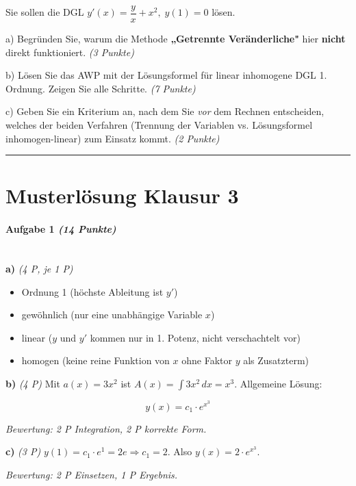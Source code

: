 \documentclass[11pt, a4paper]{article}
\begin{document}
Sie sollen die DGL $y'(x) = \dfrac{y}{x} + x^2, \; y(1) = 0$ lösen.


a) Begründen Sie, warum die Methode \textbf{„Getrennte Veränderliche"} hier \textbf{nicht} direkt funktioniert. \textit{(3 Punkte)}


b) Lösen Sie das AWP mit der Lösungsformel für linear inhomogene DGL 1. Ordnung. Zeigen Sie alle Schritte. \textit{(7 Punkte)}


c) Geben Sie ein Kriterium an, nach dem Sie \textit{vor} dem Rechnen entscheiden, welches der beiden Verfahren (Trennung der Variablen vs. Lösungsformel inhomogen-linear) zum Einsatz kommt. \textit{(2 Punkte)}



\noindent\textcolor{rulegray}{\rule{\linewidth}{0.4pt}}



\section{Musterlösung Klausur 3}

\paragraph{Aufgabe 1 \textit{(14 Punkte)}}\mbox{}\\[2pt]

\textbf{a)} \textit{(4 P, je 1 P)}

\begin{itemize}
  \item Ordnung 1 (höchste Ableitung ist $y'$)
  \item gewöhnlich (nur eine unabhängige Variable $x$)
  \item linear ($y$ und $y'$ kommen nur in 1. Potenz, nicht verschachtelt vor)
  \item homogen (keine reine Funktion von $x$ ohne Faktor $y$ als Zusatzterm)
\end{itemize}

\textbf{b)} \textit{(4 P)} Mit $a(x) = 3x^2$ ist $A(x) = \int 3x^2\,dx = x^3$. Allgemeine Lösung:

\[
y(x) = c_1 \cdot e^{x^3}
\]

\textit{Bewertung: 2 P Integration, 2 P korrekte Form.}


\textbf{c)} \textit{(3 P)} $y(1) = c_1 \cdot e^{1} = 2e \Rightarrow c_1 = 2$. Also $y(x) = 2 \cdot e^{x^3}$.

\textit{Bewertung: 2 P Einsetzen, 1 P Ergebnis.}
\end{document}
